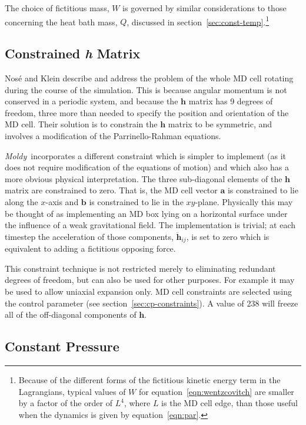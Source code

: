 \documentclass[a4paper,twoside]{report}
\providecommand{\bm}[1]{\mathbf{#1}}
\newcommand{\moldy}{\emph{Moldy}}
\begin{document}
The choice of fictitious mass, $W$ is governed by similar
considerations to those concerning the heat bath mass, $Q$, discussed
in section~\ref{sec:const-temp}.\footnote{Because of the
different forms of the fictitious kinetic energy term in the
Lagrangians, typical values of $W$ for equation~\ref{eqn:wentzcovitch}
are smaller by a factor of the order of $L^4$, where $L$ is the MD
cell edge, than those useful when the dynamics is given by
equation~\ref{eqn:par}.}

\subsection{Constrained \textit{\textbf{h}} Matrix}
Nos\'{e} and Klein\cite{nose:83} describe and address the problem of
the whole MD cell rotating during the course of the simulation.  This
is because angular momentum is not conserved in a periodic system, and
because the $\bm{h}$ matrix has 9 degrees of freedom, three more than
needed to specify the position and orientation of the MD cell.  Their
solution is to constrain the $\bm{h}$ matrix to be symmetric, and
involves a modification of the Parrinello-Rahman equations.

\moldy\ incorporates a different constraint which is 
simpler to implement (as it does not require modification of the
equations of motion) and which also has a more obvious physical
interpretation.  The three sub-diagonal elements of the $\bm{h}$
matrix are constrained to zero.  That is, the MD cell vector
$\bm{a}$ is constrained to lie along the $x$-axis and $\bm{b}$ is
constrained to lie in the $xy$-plane.  Physically this may be thought
of as implementing an MD box lying on a horizontal surface under the
influence of a weak gravitational field.  The implementation is
trivial; at each timestep the acceleration of those components,
$\ddot{\bm{h}}_{ij}$, is set to zero which is equivalent to adding a
fictitious opposing force.

This constraint technique is not restricted merely to eliminating
redundant degrees of freedom, but can also be used for other purposes.
For example it may be used to allow uniaxial expansion only.  
MD cell constraints are selected using the control parameter
 (see section~\ref{sec:cp-constraints}).  A value of
238 will freeze all of the off-diagonal components of $\bm{h}$.

\subsection{Constant Pressure}
\end{document}
